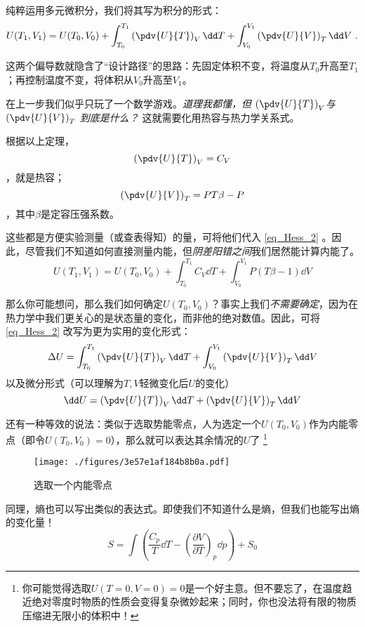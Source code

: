 纯粹运用多元微积分，我们将其写为积分的形式：
\begin{equation}\label{eq_Hess_2}
U(T_1,V_1)=U(T_0,V_0) + \int_{T_0}^{T_1} \left(\pdv{U}{T}\right)_V \dd T + \int_{V_0}^{V_1} \left(\pdv{U}{V}\right)_T \dd V ~.
\end{equation}

这两个偏导数就隐含了“设计路径”的思路：先固定体积不变，将温度从$T_0$升高至$T_1$；再控制温度不变，将体积从$V_0$升高至$V_1$。

在上一步我们似乎只玩了一个数学游戏。\textsl{道理我都懂，但 $\left(\pdv{U}{T}\right)_V$与$ \left(\pdv{U}{V}\right)_T $ 到底是什么？} 这就需要化用热容与热力学关系式。

根据以上定理，$$\left(\pdv{U}{T}\right)_V = C_V$$，就是热容；$$ \left(\pdv{U}{V}\right)_T  = PT\beta-P $$，其中$\beta$是定容压强系数。

这些都是方便实验测量（或查表得知）的量，可将他们代入 \autoref{eq_Hess_2} 。因此，尽管我们不知道如何直接测量内能，但\textsl{阴差阳错之间}我们居然能计算内能了。
\begin{equation}\label{eq_Hess_1}
U(T_1,V_1)=U(T_0,V_0) + \int_{T_0}^{T_1} C_V \dd T + \int_{V_0}^{V_1} P(T\beta-1) \dd V 
\end{equation}



那么你可能想问，那么我们如何确定$U(T_0,V_0)$？事实上我们\textsl{不需要确定}，因为在热力学中我们更关心的是状态量的变化，而非他的绝对数值。因此，可将\autoref{eq_Hess_2} 改写为更为实用的变化形式：
\begin{equation}
\Delta U = \int_{T_0}^{T_1} \left(\pdv{U}{T}\right)_V \dd T + \int_{V_0}^{V_1} \left(\pdv{U}{V}\right)_T \dd V 
\end{equation}
以及微分形式（可以理解为$T,V$轻微变化后$U$的变化）
\begin{equation}
\dd U =  \left(\pdv{U}{T}\right)_V \dd T +\left(\pdv{U}{V}\right)_T \dd V 
\end{equation}

还有一种等效的说法：类似于选取势能零点，人为选定一个$U(T_0,V_0)$作为内能零点（即令$U(T_0,V_0)=0$），那么就可以表达其余情况的$U$了 \footnote{你可能觉得选取$U(T = 0,V = 0)=0$是一个好主意。但不要忘了，在温度趋近绝对零度时物质的性质会变得复杂微妙起来；同时，你也没法将有限的物质压缩进无限小的体积中！}

\begin{figure}[ht]
\centering
\texttt{[image: ./figures/3e57e1af184b8b0a.pdf]}
\caption{选取一个内能零点} \label{fig_Hess_6}
\end{figure}

同理，熵也可以写出类似的表达式。即使我们不知道什么是熵，但我们也能写出熵的变化量！
\begin{equation}
S=\int \left(\frac{C_p}{T}\dd T-\left(\frac{\partial V}{\partial T}\right)_p\dd p\right)+S_0
\end{equation}